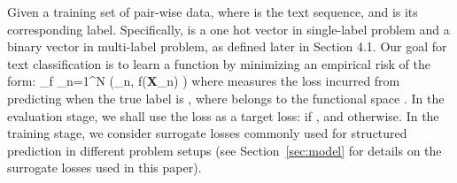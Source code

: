 \documentclass[11pt,a4paper]{article}
\newcommand{\beq}{\vspace{0mm}}
\newcommand{\Xmat}[0]{{{\bf X}}}
\newcommand{\yv}{\boldsymbol{y}}
\newcommand{\Fcal}{\mathcal{F}}
\begin{document}
Given a training set  of pair-wise data,
where   is the text sequence, and  is its corresponding label. Specifically,  is a one hot vector in single-label problem and a binary vector in multi-label problem, as defined later in Section 4.1.
Our goal for text classification is to learn a function  by minimizing an empirical risk of the form:
	\vspace{-2mm}
\beq
\min_{f \in \Fcal}  \sum_{n=1}^{N} 
\delta (\yv_n, f(\Xmat_n) )
	\vspace{-2mm}
\label{eq:objective}
\eeq
where   measures the loss incurred from
predicting  when the true label is , where  belongs to the functional space . 
In the evaluation stage, we shall use the  loss as a target loss:  if , and  otherwise. 
In the training stage, we consider surrogate losses commonly used for structured prediction in different problem setups (see Section~\ref{sec:model} for details on the surrogate losses used
in this paper).
\end{document}
